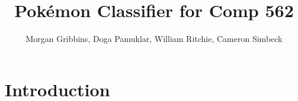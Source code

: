 \documentclass[12pt,letterpaper]{article}
\title{Pokémon Classifier for Comp 562}
\author{Morgan Gribbins, Doga Pamuklar, William Ritchie, Cameron Simbeck}
\date{}
\begin{document}
\maketitle{}

\section{Introduction}
\end{document}
